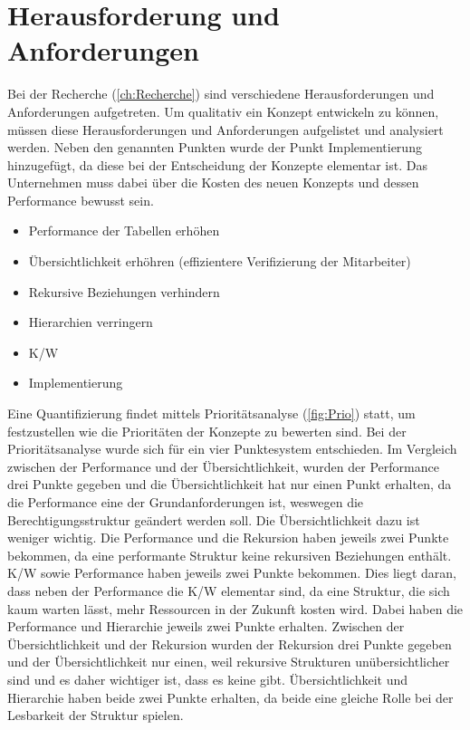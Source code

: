 \section{Herausforderung und Anforderungen}
\label{sec:chapter04:Herausforderung}
Bei der Recherche (\ref{ch:Recherche}) sind verschiedene Herausforderungen und Anforderungen aufgetreten.
Um qualitativ ein Konzept entwickeln zu können, müssen diese Herausforderungen und Anforderungen aufgelistet und analysiert werden.
Neben den genannten Punkten wurde der Punkt Implementierung hinzugefügt, da diese bei der Entscheidung der Konzepte elementar ist.
Das Unternehmen muss dabei über die Kosten des neuen Konzepts und dessen Performance bewusst sein.
\begin{itemize}
	\item Performance der Tabellen erhöhen 
	\item Übersichtlichkeit erhöhren (effizientere Verifizierung der Mitarbeiter)
	\item Rekursive Beziehungen verhindern
	\item Hierarchien verringern
	\item \ac{K/W}
	\item Implementierung
\end{itemize}
Eine Quantifizierung findet mittels Prioritätsanalyse (\ref{fig:Prio}) statt, um festzustellen wie die Prioritäten der Konzepte zu bewerten sind. \cite{BdIufH}
Bei der Prioritätsanalyse wurde sich für ein vier Punktesystem entschieden.
\newline
Im Vergleich zwischen der Performance und der Übersichtlichkeit, wurden der Performance drei Punkte gegeben und die Übersichtlichkeit hat nur einen Punkt erhalten, da die Performance eine der Grundanforderungen ist, weswegen die Berechtigungsstruktur geändert werden soll.
Die Übersichtlichkeit dazu ist weniger wichtig.
Die Performance und die Rekursion haben jeweils zwei Punkte bekommen, da eine performante Struktur keine rekursiven Beziehungen enthält.
\ac{K/W} sowie Performance haben jeweils zwei Punkte bekommen.
Dies liegt daran, dass neben der Performance die \ac{K/W} elementar sind, da eine Struktur, die sich kaum warten lässt, mehr Ressourcen in der Zukunft kosten wird.
Dabei haben die Performance und Hierarchie jeweils zwei Punkte erhalten.
Zwischen der Übersichtlichkeit und der Rekursion wurden der Rekursion drei Punkte gegeben und der Übersichtlichkeit nur einen, weil rekursive Strukturen unübersichtlicher sind und es daher wichtiger ist, dass es keine gibt.
Übersichtlichkeit und Hierarchie haben beide zwei Punkte erhalten, da beide eine gleiche Rolle bei der Lesbarkeit der Struktur spielen.
